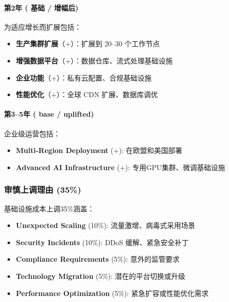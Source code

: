 \documentclass[11pt, a4paper, oneside]{article}
\begin{document}
\paragraph{第2年 ( 基础 /  增幅后)}
为适应增长而扩展包括：
\begin{itemize}
    \item \textbf{生产集群扩展}（+）：扩展到 20--30 个工作节点
    \item \textbf{增强数据平台}（+）：数据仓库、流式处理基础设施
    \item \textbf{企业功能}（+）：私有云配置、合规基础设施
    \item \textbf{性能优化}（+）：全球 CDN 扩展、数据库调优



\end{itemize}

\paragraph{第3--5年 ( base /  uplifted)}
企业级运营包括：
\begin{itemize}
    \item \textbf{Multi-Region Deployment} (+): 在欧盟和美国部署
    \item \textbf{Advanced AI Infrastructure} (+): 专用GPU集群、微调基础设施
\end{itemize}

\subsubsection{审慎上调理由 (35\%)}
基础设施成本上调35\%涵盖：
\begin{itemize}
    \item \textbf{Unexpected Scaling} (10\%): 流量激增、病毒式采用场景
    \item \textbf{Security Incidents} (10\%): DDoS 缓解、紧急安全补丁
    \item \textbf{Compliance Requirements} (5\%): 意外的监管要求
    \item \textbf{Technology Migration} (5\%): 潜在的平台切换或升级
    \item \textbf{Performance Optimization} (5\%): 紧急扩容或性能优化需求
\end{itemize}
\end{document}
